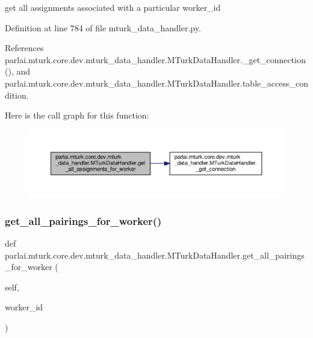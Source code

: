 \begin{DoxyVerb}get all assignments associated with a particular worker_id\end{DoxyVerb}
 

Definition at line 784 of file mturk\+\_\+data\+\_\+handler.\+py.



References parlai.\+mturk.\+core.\+dev.\+mturk\+\_\+data\+\_\+handler.\+M\+Turk\+Data\+Handler.\+\_\+get\+\_\+connection(), and parlai.\+mturk.\+core.\+dev.\+mturk\+\_\+data\+\_\+handler.\+M\+Turk\+Data\+Handler.\+table\+\_\+access\+\_\+condition.

Here is the call graph for this function\+:
\nopagebreak
\begin{figure}[H]
\begin{center}
\leavevmode
\includegraphics[width=350pt]{classparlai_1_1mturk_1_1core_1_1dev_1_1mturk__data__handler_1_1MTurkDataHandler_a46feee52b8950688e8d916dcd263d2c1_cgraph}
\end{center}
\end{figure}
\mbox{\label{classparlai_1_1mturk_1_1core_1_1dev_1_1mturk__data__handler_1_1MTurkDataHandler_ab4f6bcf277206b3ac02971f208c2ec32}} 
\subsubsection{\texorpdfstring{get\+\_\+all\+\_\+pairings\+\_\+for\+\_\+worker()}{get\_all\_pairings\_for\_worker()}}
{\footnotesize\ttfamily def parlai.\+mturk.\+core.\+dev.\+mturk\+\_\+data\+\_\+handler.\+M\+Turk\+Data\+Handler.\+get\+\_\+all\+\_\+pairings\+\_\+for\+\_\+worker (\begin{DoxyParamCaption}\item[{}]{self,  }\item[{}]{worker\+\_\+id }\end{DoxyParamCaption})}

